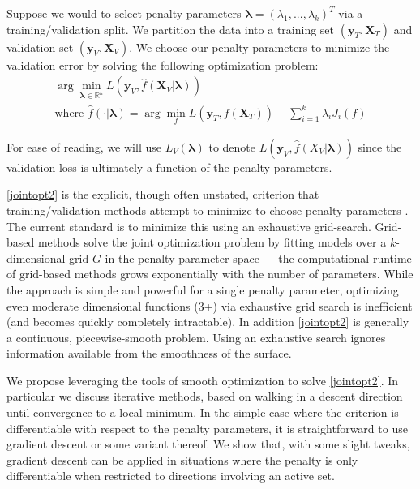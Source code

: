 \documentclass[10pt,letterpaper]{article}
\begin{document}
Suppose we would to select penalty parameters $\boldsymbol{\lambda} = (\lambda_1, ..., \lambda_k)^T$ via a training/validation split. We partition the data into a training set $(\boldsymbol{y}_T , \boldsymbol{X}_T)$ and validation set $(\boldsymbol{y}_V, \boldsymbol{X}_V)$. We choose our penalty parameters to minimize the validation error by solving the following optimization problem:
\begin{equation}
\begin{array}{c}
\arg \min_{\boldsymbol{\lambda} \in \mathbb{R}^k} L(\boldsymbol{y}_V, \hat f(\boldsymbol{X}_V | \boldsymbol{\lambda})) \\
\text{where } \hat f(\cdot | \boldsymbol{\lambda}) = \arg \min_f L(\boldsymbol{y}_T, f (\boldsymbol{X}_T)) + \sum\limits_{i=1}^k \lambda_i J_i(f)
\end{array}
\label{jointopt2}
\end{equation}

For ease of reading, we will use $L_V(\boldsymbol{\lambda})$ to denote $L(\boldsymbol y_V, \hat f(X_V | \boldsymbol{\lambda}))$ since the validation loss is ultimately a function of the penalty parameters.

\eqref{jointopt2} is the explicit, though often unstated, criterion that training/validation methods attempt to minimize to choose penalty parameters . The current standard is to minimize this using an exhaustive grid-search. Grid-based methods solve the joint optimization problem by fitting models over a $k$-dimensional grid $G$ in the penalty parameter space --- the computational runtime of grid-based methods grows exponentially with the number of parameters. While the approach is simple and powerful for a single penalty parameter, optimizing even moderate dimensional functions (3+) via exhaustive grid search is inefficient (and becomes quickly completely intractable).  In addition \eqref{jointopt2} is generally a continuous, piecewise-smooth problem. Using an exhaustive search ignores information available from the smoothness of the surface. 

We propose leveraging the tools of smooth optimization to solve \eqref{jointopt2}. In particular we discuss iterative methods, based on walking in a descent direction until convergence to a local minimum. In the simple case where the criterion is differentiable with respect to the penalty parameters, it is straightforward to use gradient descent or some variant thereof. We show that, with some slight tweaks, gradient descent can be applied in situations where the penalty is only differentiable when restricted to directions involving an active set.
\end{document}

